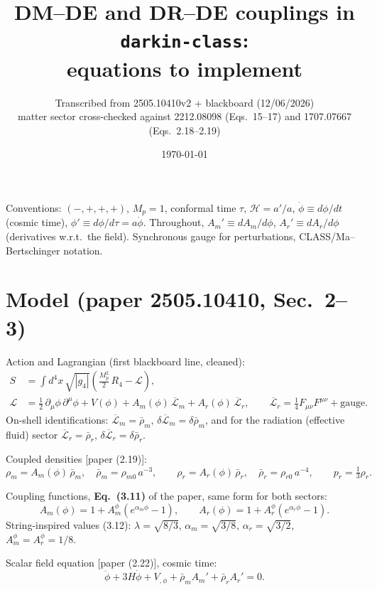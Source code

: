 \documentclass[11pt]{article}
\title{DM--DE and DR--DE couplings in \texttt{darkin-class}:\\ equations to implement}
\author{Transcribed from 2505.10410v2 + blackboard (12/06/2026)\\
\small matter sector cross-checked against 2212.08098 (Eqs.~15--17) and 1707.07667 (Eqs.~2.18--2.19)}
\date{\today}
\newcommand{\Lm}{\overline{\mathcal{L}}_{m}}
\newcommand{\Lr}{\overline{\mathcal{L}}_{r}}
\newcommand{\rhob}{\bar\rho}
\newcommand{\Am}{A_{m}}
\newcommand{\Ar}{A_{r}}
\newcommand{\cH}{\mathcal{H}}
\begin{document}
\maketitle

\noindent Conventions: $(-,+,+,+)$, $M_p=1$, conformal time $\tau$, $\cH=a'/a$,
$\dot\phi \equiv d\phi/dt$ (cosmic time), $\phi' \equiv d\phi/d\tau = a\dot\phi$.
Throughout, $\Am' \equiv d\Am/d\phi$, $\Ar' \equiv d\Ar/d\phi$ (derivatives w.r.t.\ the field).
Synchronous gauge for perturbations, CLASS/Ma--Bertschinger notation.

\section{Model (paper 2505.10410, Sec.~2--3)}

Action and Lagrangian (first blackboard line, cleaned):
\begin{align}
S &= \int d^{4}x\,\sqrt{|g_4|}\left(\frac{M_p^{2}}{2}\,R_4-\mathcal{L}\right),\\
\mathcal{L} &= \frac12\,\partial_{\mu}\phi\,\partial^{\mu}\phi
   + V(\phi)
   + \Am(\phi)\,\Lm
   + \Ar(\phi)\,\Lr ,
\qquad
\Lr = \tfrac14 F_{\mu\nu}F^{\mu\nu} + \text{gauge} .
\end{align}
On-shell identifications: $\Lm=\rhob_m$, $\delta\Lm=\delta\rhob_m$, and for the
radiation (effective fluid) sector $\Lr=\rhob_r$, $\delta\Lr=\delta\rhob_r$.

Coupled densities [paper (2.19)]:
\begin{equation}
\rho_m=\Am(\phi)\,\rhob_m,\quad \rhob_m=\rho_{m0}\,a^{-3},
\qquad
\rho_r=\Ar(\phi)\,\rhob_r,\quad \rhob_r=\rho_{r0}\,a^{-4},
\qquad p_r=\tfrac13\rho_r .
\end{equation}

Coupling functions, \textbf{Eq.~(3.11)} of the paper, same form for both sectors:
\begin{equation}
\boxed{\;
\Am(\phi)=1+A^{\phi}_{m}\left(e^{\alpha_m\phi}-1\right),
\qquad
\Ar(\phi)=1+A^{\phi}_{r}\left(e^{\alpha_r\phi}-1\right).
\;}
\label{eq:A311}
\end{equation}
String-inspired values (3.12): $\lambda=\sqrt{8/3}$, $\alpha_m=\sqrt{3/8}$,
$\alpha_r=\sqrt{3/2}$, $A^{\phi}_m=A^{\phi}_r=1/8$.

Scalar field equation [paper (2.22)], cosmic time:
\begin{equation}
\ddot\phi+3H\dot\phi+V_{,\phi}+\rhob_m \Am'+\rhob_r \Ar'=0 .
\label{eq:KGbg}
\end{equation}
\end{document}
